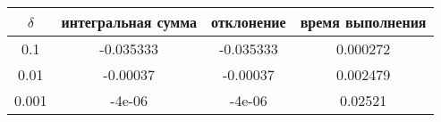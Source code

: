\begin{tabular}{|c|c|c|c|}
    \hline
    $\delta$ & интегральная сумма & отклонение & время выполнения\\
    \hline
    0.1 & -0.035333 & -0.035333 & 0.000272\\
    \hline
    0.01 & -0.00037 & -0.00037 & 0.002479\\
    \hline
    0.001 & -4e-06 & -4e-06 & 0.02521\\
    \hline
\end{tabular}
